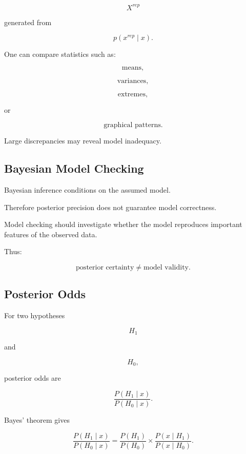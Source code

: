 \[
X^{rep}
\]

generated from

\[
\boxed{
p
(
x^{rep}\mid x
).
}
\]

One can compare statistics such as:

\[
\boxed{
\text{means},
}
\]

\[
\boxed{
\text{variances},
}
\]

\[
\boxed{
\text{extremes},
}
\]

or

\[
\boxed{
\text{graphical patterns}.
}
\]

Large discrepancies may reveal model inadequacy.

\subsection{Bayesian Model Checking}
\label{subsec:bayesian-model-checking}

Bayesian inference conditions on the assumed model.

Therefore posterior precision does not guarantee model correctness.

Model checking should investigate whether the model reproduces important
features of the observed data.

Thus:

\[
\boxed{
\text{posterior certainty}
\neq
\text{model validity}.
}
\]

\subsection{Posterior Odds}
\label{subsec:posterior-odds}

For two hypotheses

\[
H_1
\]

and

\[
H_0,
\]

posterior odds are

\[
\boxed{
\frac{
P(H_1\mid x)
}{
P(H_0\mid x)
}.
}
\]

Bayes' theorem gives

\[
\boxed{
\frac{
P(H_1\mid x)
}{
P(H_0\mid x)
}
=
\frac{
P(H_1)
}{
P(H_0)
}
\times
\frac{
P(x\mid H_1)
}{
P(x\mid H_0)
}.
}
\]

